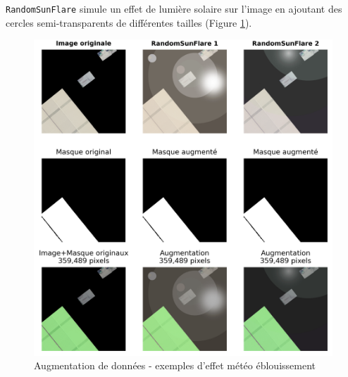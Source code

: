 \texttt{RandomSunFlare} simule un effet de lumière solaire sur l'image en ajoutant des cercles semi-transparents de différentes tailles (Figure \ref{fig:ch36_augmentations_12_effets_meteo_eblouissement}).
\begin{figure}[H]
    \centering
    \includegraphics[width=1\linewidth]{02-main/figures/ch3/ch36_augmentations_12_effets_meteo_eblouissement.png}
    \caption{Augmentation de données - exemples d'effet météo éblouissement}
    \label{fig:ch36_augmentations_12_effets_meteo_eblouissement}
\end{figure}


